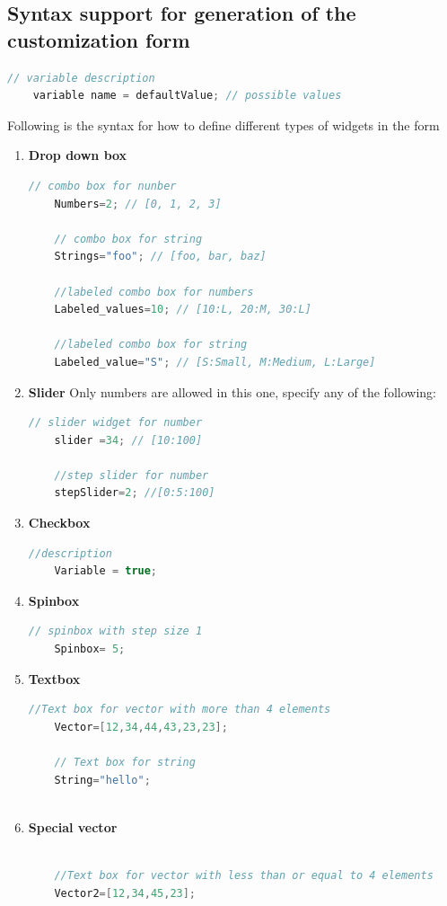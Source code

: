 \subsection{Syntax support for generation of the customization form}

	\begin{lstlisting}[language=c++]
	// variable description
	variable name = defaultValue; // possible values
	\end{lstlisting}

Following is the syntax for how to define different types of widgets in the form

\begin{enumerate}
	\item \textbf{Drop down box}
	\begin{lstlisting}[language=c++]
	// combo box for nunber
	Numbers=2; // [0, 1, 2, 3]
	
	// combo box for string
	Strings="foo"; // [foo, bar, baz]
	
	//labeled combo box for numbers
	Labeled_values=10; // [10:L, 20:M, 30:L]
	
	//labeled combo box for string
	Labeled_value="S"; // [S:Small, M:Medium, L:Large]
	\end{lstlisting}
	\item \textbf{Slider} Only numbers are allowed in this one, specify any of the following:
	\begin{lstlisting}[language=c++]
	// slider widget for number
	slider =34; // [10:100]
	
	//step slider for number
	stepSlider=2; //[0:5:100]
	\end{lstlisting}
	\item \textbf{Checkbox}
	\begin{lstlisting}[language=c++]
	//description
	Variable = true;
	\end{lstlisting}
	\item \textbf{Spinbox}
	\begin{lstlisting}[language=c++]
	// spinbox with step size 1
	Spinbox= 5;
	\end{lstlisting}
	\item \textbf{Textbox}
	\begin{lstlisting}[language=c++]
	//Text box for vector with more than 4 elements
	Vector=[12,34,44,43,23,23];
	
	// Text box for string
	String="hello";
	
	\end{lstlisting}
	\item \textbf{Special vector}
	\begin{lstlisting}[language=c++]
	
	//Text box for vector with less than or equal to 4 elements
	Vector2=[12,34,45,23];
	\end{lstlisting}

\end{enumerate}

